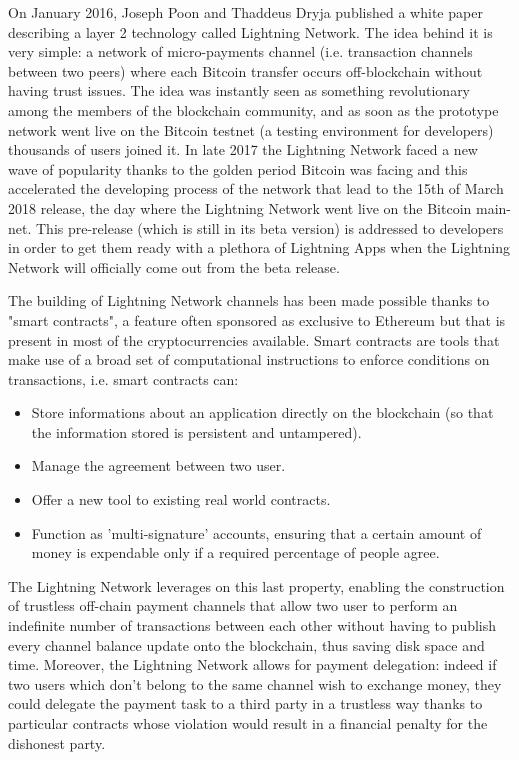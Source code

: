 		On January 2016, Joseph Poon and Thaddeus Dryja published a white paper describing a layer 2 technology called Lightning Network\cite{Poon2016}. The idea behind it is very simple: a network of micro-payments channel (i.e. transaction channels between two peers) where each Bitcoin transfer occurs off-blockchain without having trust issues. The idea was instantly seen as something revolutionary among the members of the blockchain community, and as soon as the prototype network went live on the Bitcoin testnet (a testing environment for developers) thousands of users joined it. In late 2017 the Lightning Network faced a new wave of popularity thanks to the golden period Bitcoin was facing and this accelerated the developing process of the network that lead to the 15th of March 2018 release, the day where the Lightning Network went live on the Bitcoin main-net. This pre-release (which is still in its beta version) is addressed to developers in order to get them ready with a plethora of Lightning Apps when the Lightning Network will officially come out from the beta release.
		
		The building of Lightning Network channels has been made possible thanks to "smart contracts", a feature often sponsored as exclusive to Ethereum\cite{Buterin2014} but that is present in most of the cryptocurrencies available. Smart contracts are tools that make use of a broad set of computational instructions to enforce conditions on transactions, i.e. smart contracts can:
		\begin{itemize}
			\item Store informations about an application directly on the blockchain (so that the information stored is persistent and untampered).
			\item Manage the agreement between two user.
			\item Offer a new tool to existing real world contracts.
			\item Function as 'multi-signature' accounts, ensuring that a certain amount of money is expendable only if a required percentage of people agree.
		\end{itemize}
	
		The Lightning Network leverages on this last property, enabling the construction of trustless off-chain payment channels that allow two user to perform an indefinite number of transactions between each other without having to publish every channel balance update onto the blockchain, thus saving disk space and time. Moreover, the Lightning Network allows for payment delegation: indeed if two users which don't belong to the same channel wish to exchange money, they could delegate the payment task to a third party in a trustless way thanks to particular contracts whose violation would result in a financial penalty for the dishonest party.
		
